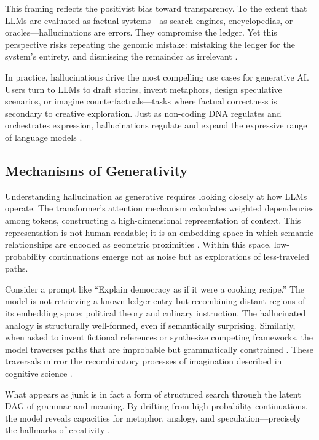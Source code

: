 \documentclass[12pt]{article}
\begin{document}
{{{This framing reflects the positivist bias toward transparency. To the extent that LLMs are evaluated as factual systems---as search engines, encyclopedias, or oracles---hallucinations are errors. They compromise the ledger. Yet this perspective risks repeating the genomic mistake: mistaking the ledger for the system’s entirety, and dismissing the remainder as irrelevant \citep{keller2000}.

In practice, hallucinations drive the most compelling use cases for generative AI. Users turn to LLMs to draft stories, invent metaphors, design speculative scenarios, or imagine counterfactuals---tasks where factual correctness is secondary to creative exploration. Just as non-coding DNA regulates and orchestrates expression, hallucinations regulate and expand the expressive range of language models \citep{barad2007}.

\subsection{Mechanisms of Generativity}
Understanding hallucination as generative requires looking closely at how LLMs operate. The transformer’s attention mechanism calculates weighted dependencies among tokens, constructing a high-dimensional representation of context. This representation is not human-readable; it is an embedding space in which semantic relationships are encoded as geometric proximities \citep{vaswani2017}. Within this space, low-probability continuations emerge not as noise but as explorations of less-traveled paths.

Consider a prompt like ``Explain democracy as if it were a cooking recipe.'' The model is not retrieving a known ledger entry but recombining distant regions of its embedding space: political theory and culinary instruction. The hallucinated analogy is structurally well-formed, even if semantically surprising. Similarly, when asked to invent fictional references or synthesize competing frameworks, the model traverses paths that are improbable but grammatically constrained \citep{shanahan2023}. These traversals mirror the recombinatory processes of imagination described in cognitive science \citep{hofstadter1995}.

What appears as junk is in fact a form of structured search through the latent DAG of grammar and meaning. By drifting from high-probability continuations, the model reveals capacities for metaphor, analogy, and speculation---precisely the hallmarks of creativity \citep{bowker2005}.

}}}
\end{document}
